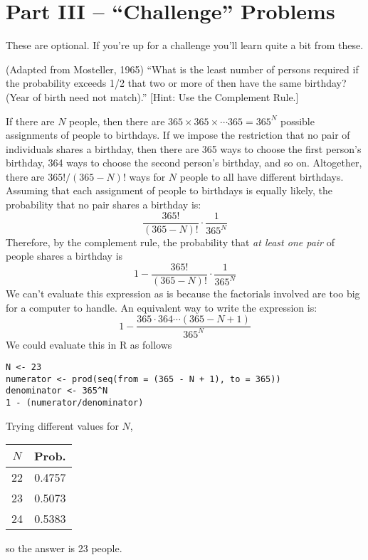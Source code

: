 \documentclass[addpoints,12pt]{exam}
\begin{document}
\begin{questions}
\begin{parts}
\begin{solution}
		\end{solution}
\end{parts}


 
\section*{Part III -- ``Challenge'' Problems}
These are optional. If you're up for a challenge you'll learn quite a bit from these.


\question (Adapted from Mosteller, 1965) ``What is the least number of persons required if the probability exceeds 1/2 that two or more of then have the same birthday? (Year of birth need not match).''
	[Hint: Use the Complement Rule.]
	\begin{solution}
If there are $N$ people, then there are $365 \times 365 \times \cdots 365 = 365^N$ possible assignments of people to birthdays. If we impose the restriction that no pair of individuals shares a birthday, then there are 365 ways to choose the first person's birthday, 364 ways to choose the second person's birthday, and so on. Altogether, there are $365!/(365 - N)!$ ways for $N$ people to all have different birthdays. Assuming that each assignment of people to birthdays is equally likely, the probability that no pair shares a birthday is:
		$$\frac{365!}{(365 - N)!} \cdot \frac{1}{365^N}$$
Therefore, by the complement rule, the probability that \emph{at least one pair} of people shares a birthday is
	$$1 - \frac{365!}{(365 - N)!} \cdot \frac{1}{365^N}$$
We can't evaluate this expression as is because the factorials involved are too big for a computer to handle. An equivalent way to write the expression is:
	$$1 - \frac{365 \cdot 364 \cdots \left(365 - N + 1\right)}{365^N}$$
We could evaluate this in R as follows
\begin{verbatim}
N <- 23
numerator <- prod(seq(from = (365 - N + 1), to = 365))
denominator <- 365^N
1 - (numerator/denominator)
	\end{verbatim}
Trying different values for $N$,
	\begin{center}
	\begin{tabular}{cc}
	$N$ & Prob.\\
	\hline
22   &  0.4757\\
23   &  0.5073\\
24   &  0.5383
	\end{tabular}
	\end{center}
so the answer is 23 people.
	\end{solution}
	

\end{questions}
\end{document}
